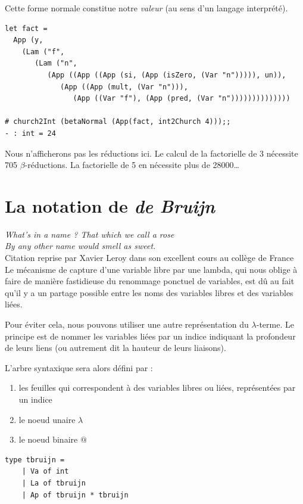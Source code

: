 \documentclass[11pt]{book}
\begin{document}
Cette forme normale constitue notre \textit{valeur} (au sens d'un langage interprété).
\begin{Verbatim}
let fact =
  App (y,
    (Lam ("f",
       (Lam ("n",
          (App ((App ((App (si, (App (isZero, (Var "n"))))), un)),
             (App ((App (mult, (Var "n"))),
                (App ((Var "f"), (App (pred, (Var "n"))))))))))))))

# church2Int (betaNormal (App(fact, int2Church 4)));;
- : int = 24																																							 
\end{Verbatim}
Nous n'afficherons pas les réductions ici. Le calcul de la factorielle de 3 nécessite 705 $\beta$-réductions. 
La factorielle de 5 en nécessite plus de 28000\ldots


\section{La notation de \textit{de Bruijn}}
\noindent
\textit{What's in a name ? That which we call a rose \\
	   By any other name would smell as sweet.}\cite{WS} \\
	   Citation reprise par Xavier Leroy dans
	   son excellent cours au collège de France \\


\vspace{0.4cm}
Le mécanisme de capture d'une variable libre par une lambda, qui nous oblige à faire de manière fastidieuse
du renommage ponctuel de variables, est dû au fait qu'il y a un partage possible entre les noms des variables
libres et des variables liées. 

Pour éviter cela, nous pouvons utiliser une autre représentation du $\lambda$-terme. Le principe est
de nommer les variables liées par un indice indiquant la profondeur de leurs liens (ou autrement dit la
hauteur de leurs liaisons).

L'arbre syntaxique sera alors défini par :
\begin{enumerate}
	\item les feuilles qui correspondent à des variables libres ou liées, représentées par un indice
	\item le noeud unaire $\lambda$
	\item le noeud binaire $@$
\end{enumerate}

\begin{Verbatim}
type tbruijn =
	| Va of int
	| La of tbruijn 
	| Ap of tbruijn * tbruijn
\end{Verbatim}
	
\end{document}

